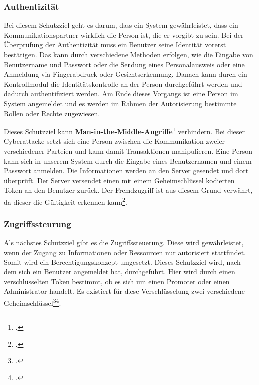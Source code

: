 \subsubsection{Authentizität}
Bei diesem Schutzziel geht es darum, dass ein System gewährleistet, dass ein Kommunikationspartner wirklich die Person ist, die er vorgibt zu sein. Bei der Überprüfung der Authentizität muss ein Benutzer seine Identität vorerst bestätigen. Das kann durch verschiedene Methoden erfolgen, wie die Eingabe von Benutzername und Passwort oder die Sendung eines Personalausweis oder eine Anmeldung via Fingerabdruck oder Gesichtserkennung. Danach kann durch ein Kontrollmodul die Identitätskontrolle an der Person durchgeführt werden und dadurch authentifiziert werden. Am Ende dieses Vorgangs ist eine Person im System angemeldet und es werden im Rahmen der Autorisierung bestimmte Rollen oder Rechte zugewiesen.

Dieses Schutzziel kann \textbf{Man-in-the-Middle-Angriffe}\footcite{man-in-middle} verhindern. Bei dieser Cyberattacke setzt sich eine Person zwischen die Kommunikation zweier verschiedener Parteien und kann damit Transaktionen manipulieren. 
Eine Person kann sich in unserem System durch die Eingabe eines Benutzernamen und einem Passwort anmelden. Die Informationen werden an den Server gesendet und dort überprüft. Der Server versendet einen mit einem Geheimschlüssel kodierten Token an den Benutzer zurück. Der Fremdzugriff ist aus diesem Grund verwährt, da dieser die Gültigkeit erkennen kann\footcite{Lehrunterlagen-HTL-cloud}.

\subsubsection{Zugriffssteurung}
Als nächstes Schutzziel gibt es die Zugriffssteuerung. Diese wird gewährleistet, wenn der Zugang zu Informationen oder Ressourcen nur autorisiert stattfindet. Somit wird ein Berechtigungskonzept umgesetzt. 
Dieses Schutzziel wird, nach dem sich ein Benutzer angemeldet hat, durchgeführt. Hier wird durch einen verschlüsselten Token bestimmt, ob es sich um einen Promoter oder einen Administrator handelt. Es existiert für diese Verschlüsselung zwei verschiedene Geheimschlüssel\footcite{Lehrunterlagen-HTL-cloud}\footcite{zugang}.

